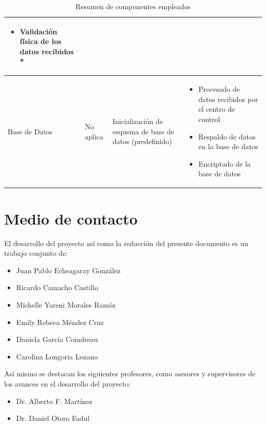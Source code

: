 \documentclass{article}
\begin{document}
\begin{table}[htbp]
{\begin{tabular}{| m{2cm} | m{3cm} | m{5cm} | m{9cm} |}
\begin{itemize}[noitemsep]
                        \item Validación física de los datos recibidos *
                    \end{itemize} \\
                    \hline
                    Base de Datos &
                    No aplica &
                    Inicialización de esquema de base de datos (predefinido) &
                    \begin{itemize}[noitemsep]
                        \item Procesado de datos recibidos por el centro de control
                        \item Respaldo de datos en la base de datos
                        \item Encriptado de la base de datos
                    \end{itemize} \\
                    \hline
                \end{tabular}}
                \label{tab:component_summary}
                \caption{Resumen de componentes empleados}
            \end{table}

    \section{Medio de contacto}\label{sec:contact}

        El desarrollo del proyecto así como la redacción del presente documento es un trabajo conjunto de:
        \begin{itemize}[noitemsep]
            \item Juan Pablo Echeagaray González
            \item Ricardo Camacho Castillo
            \item Michelle Yareni Morales Ramóz
            \item Emily Rebeca Méndez Cruz
            \item Daniela García Coindreau
            \item Carolina Longoria Lozano
        \end{itemize}

        Así mismo se destacan los siguientes profesores, como asesores y supervisores de los avances en el desarrollo del proyecto:
        \begin{itemize}[noitemsep]
            \item Dr. Alberto F. Martínez
            \item Dr. Daniel Otero Fadul
        \end{itemize}
\end{document}
